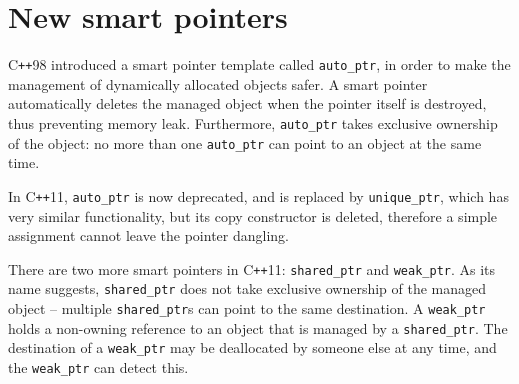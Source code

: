 \documentclass[12pt,a4paper]{article}
\begin{document}

\section{New smart pointers}

C\texttt{++}98 introduced a smart pointer template called \lstinline[style=CPP_CODE]|auto_ptr|, in order to make the management of dynamically allocated objects safer. A smart pointer automatically deletes the managed object when the pointer itself is destroyed, thus preventing memory leak. Furthermore, \lstinline[style=CPP_CODE]|auto_ptr| takes exclusive ownership of the object: no more than one \lstinline[style=CPP_CODE]|auto_ptr| can point to an object at the same time.

In C\texttt{++}11, \lstinline[style=CPP_CODE]|auto_ptr| is now deprecated, and is replaced by \lstinline[style=CPP_CODE]|unique_ptr|, which has very similar functionality, but its copy constructor is deleted, therefore a simple assignment cannot leave the pointer dangling.

There are two more smart pointers in C\texttt{++}11: \lstinline[style=CPP_CODE]|shared_ptr| and \lstinline[style=CPP_CODE]|weak_ptr|. As its name suggests, \lstinline[style=CPP_CODE]|shared_ptr| does not take exclusive ownership of the managed object -- multiple \lstinline[style=CPP_CODE]|shared_ptr|s can point to the same destination. A \lstinline[style=CPP_CODE]|weak_ptr| holds a non-owning reference to an object that is managed by a \lstinline[style=CPP_CODE]|shared_ptr|. The destination of a \lstinline[style=CPP_CODE]|weak_ptr| may be deallocated by someone else at any time, and the \lstinline[style=CPP_CODE]|weak_ptr| can detect this.
\end{document}
